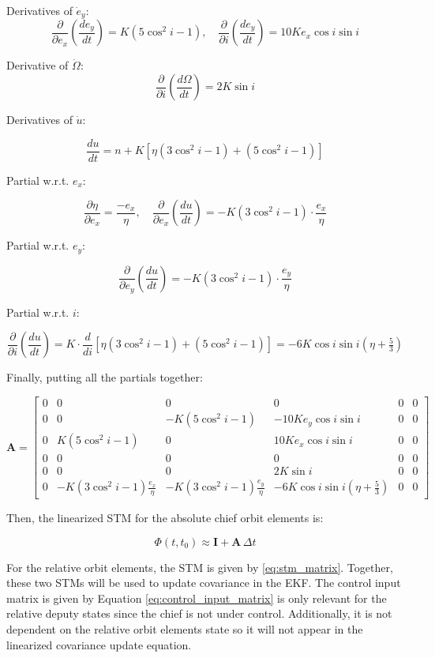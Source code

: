 Derivatives of \( \dot{e}_y \):
\[
\frac{\partial}{\partial e_x} \left( \frac{d e_y}{dt} \right) = K (5 \cos^2 i - 1), \quad
\frac{\partial}{\partial i} \left( \frac{d e_y}{dt} \right) = 10 K e_x \cos i \sin i
\]

Derivative of \( \dot{\Omega} \):
\[
\frac{\partial}{\partial i} \left( \frac{d \Omega}{dt} \right) = 2K \sin i
\]

Derivatives of \( \dot{u} \):

\[
\frac{d u}{dt} = n + K \left[ \eta (3 \cos^2 i - 1) + (5 \cos^2 i - 1) \right]
\]

Partial w.r.t. \( e_x \):

\[
\frac{\partial \eta}{\partial e_x} = \frac{-e_x}{\eta}, \quad
\frac{\partial}{\partial e_x} \left( \frac{du}{dt} \right) = -K (3 \cos^2 i - 1) \cdot \frac{e_x}{\eta}
\]

Partial w.r.t. \( e_y \):

\[
\frac{\partial}{\partial e_y} \left( \frac{du}{dt} \right) = -K (3 \cos^2 i - 1) \cdot \frac{e_y}{\eta}
\]

Partial w.r.t. \( i \):

\[
\frac{\partial}{\partial i} \left( \frac{du}{dt} \right)
= K \cdot \frac{d}{di} \left[ \eta (3 \cos^2 i - 1) + (5 \cos^2 i - 1) \right]
= -6 K \cos i \sin i \left( \eta + \tfrac{5}{3} \right)
\]

Finally, putting all the partials together:

\[
\mathbf{A} =
\begin{bmatrix}
0 & 0 & 0 & 0 & 0 & 0 \\
0 & 0 & -K(5\cos^2 i - 1) & -10 K e_y \cos i \sin i & 0 & 0 \\
0 & K(5\cos^2 i - 1) & 0 & 10 K e_x \cos i \sin i & 0 & 0 \\
0 & 0 & 0 & 0 & 0 & 0 \\
0 & 0 & 0 & 2K \sin i & 0 & 0 \\
0 & -K(3 \cos^2 i - 1) \frac{e_x}{\eta} &
    -K(3 \cos^2 i - 1) \frac{e_y}{\eta} &
    -6K \cos i \sin i \left( \eta + \tfrac{5}{3} \right) & 0 & 0
\end{bmatrix}
\]

Then, the linearized STM for the absolute chief orbit elements is:

\[
\Phi(t, t_0) \approx \mathbf{I} + \mathbf{A} \, \Delta t
\]

For the relative orbit elements, the STM is given by \ref{eq:stm_matrix}. Together, these two STMs will be used to update covariance in the EKF. The control input matrix is given by Equation \ref{eq:control_input_matrix} is only relevant for the relative deputy states since the chief is not under control. Additionally, it is not dependent on the relative orbit elements state so it will not appear in the linearized covariance update equation. 

